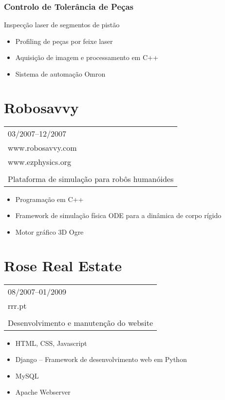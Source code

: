 \documentclass[a4paper,portuguese]{article}
\begin{document}
    \subsubsection*{Controlo de Tolerância de Peças}
        Inspecção laser de segmentos de pistão
        \begin{itemize}
        \setlength{\itemsep}{-1mm}
            \item[] Profiling de peças por feixe laser
            \item[] Aquisição de imagem e processamento em C++
            \item[] Sistema de automação Omron
        \end{itemize}
    \vspace{0.5cm}
\section*{Robosavvy}
    \begin{tabular}{l}
        03/2007--12/2007 \\
        www.robosavvy.com \\
        www.ezphysics.org \\
        \\
        Plataforma de simulação para robôs humanóides \\
    \end{tabular}
    \begin{itemize}
    \setlength{\itemsep}{-1mm}
        \item[] Programação em C++
        \item[] Framework de simulação física ODE para a dinâmica de corpo rígido
        \item[] Motor gráfico 3D Ogre
    \end{itemize}
    \vspace{0.5cm}
\section*{Rose Real Estate}
    \begin{tabular}{l}
        08/2007--01/2009 \\
        rrr.pt \\
        \\
        Desenvolvimento e manutenção do website \\
    \end{tabular}
    \begin{itemize}
    \setlength{\itemsep}{-1mm}
        \item[] HTML, CSS, Javascript
        \item[] Django -- Framework de desenvolvimento web em Python
        \item[] MySQL
        \item[] Apache Webserver
    \end{itemize}
    \vspace{0.5cm}
\end{document}

